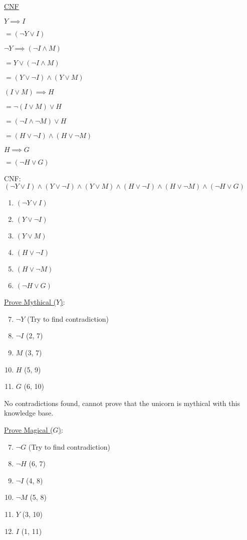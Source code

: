 \documentclass[11pt, oneside]{article}   	%
\begin{document}
\underline{CNF}

$Y \implies I$

$= (\neg Y \lor I)$

$\neg Y \implies (\neg I \land M)$

$= Y \lor (\neg I \land M)$

$= (Y \lor \neg I) \land (Y \lor M)$

$(I \lor M) \implies H$

$= \neg (I \lor M) \lor H$

$= (\neg I \land \neg M) \lor H$

$= (H \lor \neg I) \land (H \lor \neg M)$

$H \implies G$

$= (\neg H \lor G)$

CNF: $(\neg Y \lor I) \land (Y \lor \neg I) \land (Y \lor M) \land (H \lor \neg I) \land (H \lor \neg M) \land (\neg H \lor G)$

\begin{enumerate}
\item $(\neg Y \lor I)$
\item $(Y \lor \neg I)$
\item $(Y \lor M)$
\item $(H \lor \neg I)$
\item $(H \lor \neg M)$
\item $(\neg H \lor G)$
\end{enumerate}

\clearpage

\underline{Prove Mythical ($Y$)}:

\begin{enumerate}
\setcounter{enumi}{6}
\item $\neg Y$ (Try to find contradiction)
\item $\neg I$ (2, 7)
\item $M$ (3, 7)
\item $H$ (5, 9)
\item $G$ (6, 10)
\end{enumerate}

No contradictions found, cannot prove that the unicorn is mythical with this knowledge base.

\underline{Prove Magical ($G$)}:

\begin{enumerate}
\setcounter{enumi}{6}
\item $\neg G$ (Try to find contradiction)
\item $\neg H$ (6, 7)
\item $\neg I$ (4, 8)
\item $\neg M$ (5, 8)
\item $Y$ (3, 10)
\item $I$ (1, 11)
\end{enumerate}
\end{document}
